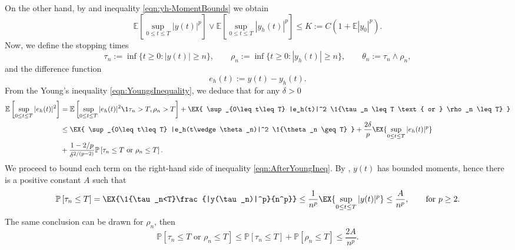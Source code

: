 \documentclass[sort&compress, preprint]{elsarticle}
\theoremstyle{definition}
\theoremstyle{plain}%
\theoremstyle{remark}
\newcommand{\m}[1]{\mathbb{E}#1}
\newcommand{\Prob}[1]{\mathbb{P}\left[#1\right]}
\begin{document}
\begin{pf}
		On the other hand, by  and inequality \eqref{eqn:yh-MomentBounds} we obtain
	\begin{equation*}
		\m\left[
			\sup_{0\leq t \leq T}
				|y(t)|^p
		\right]
		\vee
		\m\left[
			\sup_{0\leq t \leq T}
				|y_h(t)|^p
		\right]
		\leq
		K := C
		\left( 
			1+\m |y_0|^p
		\right).
	\end{equation*}
	Now, we define the stopping times
	\begin{equation}\label{eqn:StoppingTimes}
		\tau_n := 
			\inf\{
				t\geq 0: |y(t)|\geq n
			\},
		\qquad
		\rho_n := 
			\inf\{
				t\geq 0: |y_h(t)|\geq n
			\},
		\qquad
		\theta_n:=
			\tau_n \wedge \rho_n,
	\end{equation}
	and the difference function
	\begin{equation*}
		e_h(t):= y(t) - y_h(t).
	\end{equation*}
	From the Young's inequality \eqref{eqn:YoungsInequality}, we deduce that for any $\delta>0$ 
	\begin{align}
		\m\left[
			\sup_{0\leq t\leq T}
			|e_h(t)|^2
		\right]
		&=
			\m\left[
				\sup_{0\leq t\leq T}
				|e_h(t)|^2
				\1{\tau_n>T,\rho_n>T}
			\right]
			+
			\EX{
				\sup_{0\leq t\leq T}
				|e_h(t)|^2
				\1{\tau_n \leq T \text{ or } \rho_n \leq T}
			}\notag\\
		&\leq
			\EX{
				\sup_{0\leq t\leq T}
				|e_h(t\wedge \theta_n)|^2
				\1{\theta_n \geq T}
			}
			+\frac{2\delta}{p}
			\EX{
				\sup_{0\leq t\leq T}
				|e_h(t)|^p 
			}\notag \\
		&+
			\frac{1-2/p}{\delta^{2/(p-2)}}
			\Prob{\tau_n \leq T \text{ or } \rho_n \leq T}.
	\label{eqn:AfterYoungIneq}
	\end{align}
	We proceed to bound each term on the right-hand side of inequality \eqref{eqn:AfterYoungIneq}.
	By , $y(t)$ has bounded moments, hence 
	there is a positive constant $A$ such that
	\begin{equation}\label{eqn:BoundProbTauR}
		\Prob{\tau_n\leq T}
		=
			\EX{\1{\tau_n<T}\frac{|y(\tau_n)|^p}{n^p}}
		\leq
			\frac{1}{n^p}\EX{\sup_{0\leq t\leq T}|y(t)|^p} \leq \frac{A}{n^p},
			\qquad \text{for } p\geq 2.
	\end{equation}
	The same conclusion can be drawn for $\rho_n$, then
	\begin{equation} \label{eqn:BoundProbTauRorRhoR}
		\Prob{\tau_n \leq T \text{ or } \rho_n \leq T}
		\leq
			\Prob{\tau_n\leq T}+\Prob{\rho_n\leq T}
		\leq
		\frac{2A}{n^p}.
	\end{equation}

\end{pf}
\end{document}
